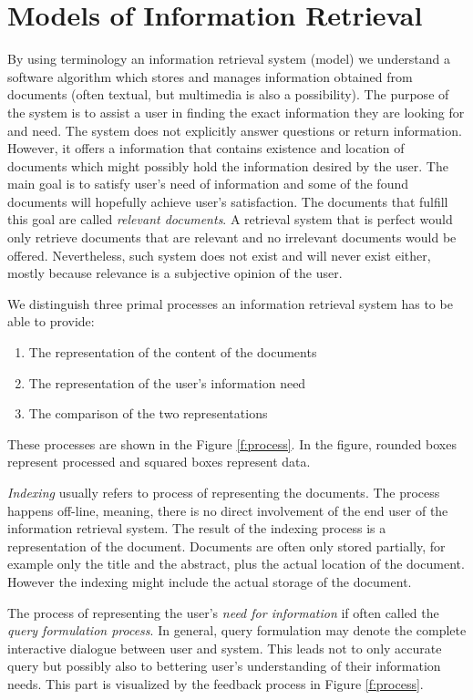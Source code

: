\documentclass[10pt,twoside,english,a4paper]{article}
\begin{document}
\section{Models of Information Retrieval} \label{models}

By using terminology an information retrieval system (model) we understand a software algorithm which stores and manages information obtained from documents (often textual, but multimedia is also a possibility). The purpose of the system is to assist a user in finding the exact information they are looking for and need. The system does not explicitly answer questions or return information. However, it offers a information that contains existence and location of documents which might possibly hold the information desired by the user. The main goal is to satisfy user's need of information and some of the found documents will hopefully achieve user's satisfaction. The documents that fulfill this goal are called \emph{relevant documents}. A retrieval system that is perfect would only retrieve documents that are relevant and no irrelevant documents would be offered. Nevertheless, such system does not exist and will never exist either, mostly because relevance is a subjective opinion of the user.

We distinguish three primal processes an information retrieval system has to be able to provide:
\begin{enumerate}
\item The representation of the content of the documents
\item The representation of the user's information need
\item The comparison of the two representations
\end{enumerate}
These processes are shown in the Figure \ref{f:process}. In the figure, rounded boxes represent processed and squared boxes represent data.

\emph{Indexing} usually refers to process of representing the documents. The process happens off-line, meaning, there is no direct involvement of the end user of the information retrieval system. The result of the indexing process is a representation of the document. Documents are often only stored partially, for example only the title and the abstract, plus the actual location of the document. However the indexing might include the actual storage of the document.

The process of representing the user's \emph{need for information} if often called the \emph{query formulation process}. In general, query formulation may denote the complete interactive dialogue between user and system. This leads not to only accurate query but possibly also to bettering user's understanding of their information needs. This part is visualized by the feedback process in Figure \ref{f:process}.
\end{document}
